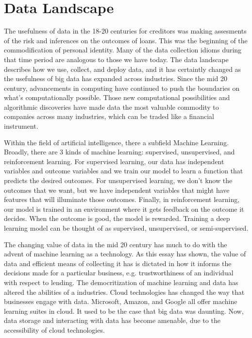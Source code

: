 \section{Data Landscape}
The usefulness of data in the 18-20 centuries for creditors was making
assesments of the risk and inferences on the outcomes of loans. This was the
beginning of the commodification of personal identity. Many of the data
collection idioms during that time period are analogous to those we have today.
The data landscape describes how we use, collect, and deploy data, and it has
certaintly changed as the usefulness of big data has expanded across
industries. Since the mid 20 century, advancements in computing have
continued to push the boundaries on what's computationally possible. Those new
computational possibilities and algorithmic discoveries have made data the most
valuable commodity to companies across many industries, which can be traded
like a financial instrument.

Within the field of artificial intelligence, there a subfield Machine Learning.
Broadly, there are 3 kinds of machine learning: supervised, unsupervised, and
reinforcement learning. For supervised learning, our data has independent
variables and outcome variables and we train our model to learn a function that
predicts the desired outcomes. For unsupervised learning, we don't know the
outcomes that we want, but we have independent variables that might have
features that will illuminate those outcomes. Finally, in reinforcement
learning, our model is trained in an environment where it gets feedback on the
outcome it decides. When the outcome is good, the model is rewarded. Training a
deep learning model can be thought of as supervised, unsupervised, or
semi-supervised.

The changing value of data in the mid 20 century has much to do with the
advent of machine learning as a technology. As this essay has shown, the value
of data and efficient means of collecting it has is dictated in how it informs
the decisions made for a particular business, e.g. trustworthiness of an
individual with respect to lending. The democritization of machine learning and
data has altered the abilities of a industries. Cloud technologies has changed
the way that businesses engage with data. Microsoft, Amazon, and Google all
offer machine learning suites in cloud. It used to be the case that big data
was daunting. Now, data storage and interacting with data has become amenable,
due to the accessibility of cloud technologies.



